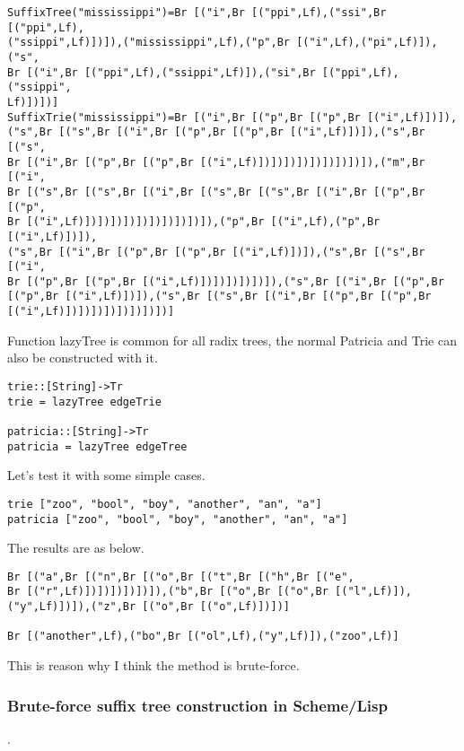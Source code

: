 \documentclass{article}
\begin{document}
\begin{verbatim}
SuffixTree("mississippi")=Br [("i",Br [("ppi",Lf),("ssi",Br [("ppi",Lf),
("ssippi",Lf)])]),("mississippi",Lf),("p",Br [("i",Lf),("pi",Lf)]),("s",
Br [("i",Br [("ppi",Lf),("ssippi",Lf)]),("si",Br [("ppi",Lf),("ssippi",
Lf)])])]
SuffixTrie("mississippi")=Br [("i",Br [("p",Br [("p",Br [("i",Lf)])]),
("s",Br [("s",Br [("i",Br [("p",Br [("p",Br [("i",Lf)])]),("s",Br [("s",
Br [("i",Br [("p",Br [("p",Br [("i",Lf)])])])])])])])])]),("m",Br [("i",
Br [("s",Br [("s",Br [("i",Br [("s",Br [("s",Br [("i",Br [("p",Br [("p",
Br [("i",Lf)])])])])])])])])])]),("p",Br [("i",Lf),("p",Br [("i",Lf)])]),
("s",Br [("i",Br [("p",Br [("p",Br [("i",Lf)])]),("s",Br [("s",Br [("i",
Br [("p",Br [("p",Br [("i",Lf)])])])])])]),("s",Br [("i",Br [("p",Br 
[("p",Br [("i",Lf)])]),("s",Br [("s",Br [("i",Br [("p",Br [("p",Br 
[("i",Lf)])])])])])])])])]
\end{verbatim}

Function lazyTree is common for all radix trees, the normal Patricia
and Trie can also be constructed with it.

\begin{lstlisting}
trie::[String]->Tr
trie = lazyTree edgeTrie

patricia::[String]->Tr
patricia = lazyTree edgeTree
\end{lstlisting}

Let's test it with some simple cases.

\begin{lstlisting}
trie ["zoo", "bool", "boy", "another", "an", "a"]
patricia ["zoo", "bool", "boy", "another", "an", "a"]
\end{lstlisting}

The results are as below.

\begin{verbatim}
Br [("a",Br [("n",Br [("o",Br [("t",Br [("h",Br [("e",
Br [("r",Lf)])])])])])]),("b",Br [("o",Br [("o",Br [("l",Lf)]),
("y",Lf)])]),("z",Br [("o",Br [("o",Lf)])])]

Br [("another",Lf),("bo",Br [("ol",Lf),("y",Lf)]),("zoo",Lf)]
\end{verbatim}

This is reason why I think the method is brute-force.

\subsubsection*{Brute-force suffix tree construction in Scheme/Lisp}.
\end{document}
